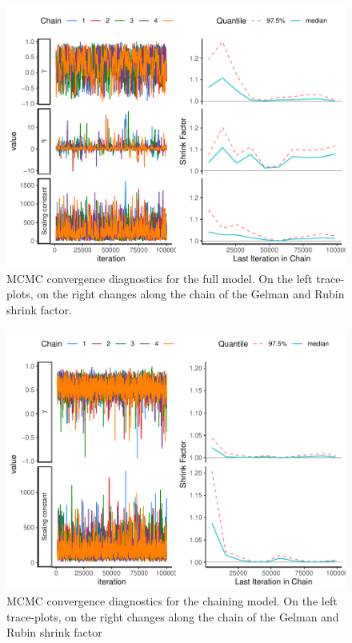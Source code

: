 \documentclass[
  12pt,
]{article}
\begin{document}
\begin{figure}
\includegraphics[width=1\linewidth]{manuscript_BE_files/figure-latex/diagnosticsfullFAA-1} \caption{MCMC convergence diagnostics for the full model. On the left trace-plots, on the right changes along the chain of the Gelman and Rubin shrink factor.}\label{fig:diagnosticsfullFAA}
\end{figure}

\begin{figure}
\includegraphics[width=1\linewidth]{manuscript_BE_files/figure-latex/diaggamFAA-1} \caption{MCMC convergence diagnostics for the chaining model. On the left trace-plots, on the right changes along the chain of the Gelman and Rubin shrink factor }\label{fig:diaggamFAA}
\end{figure}
\end{document}
